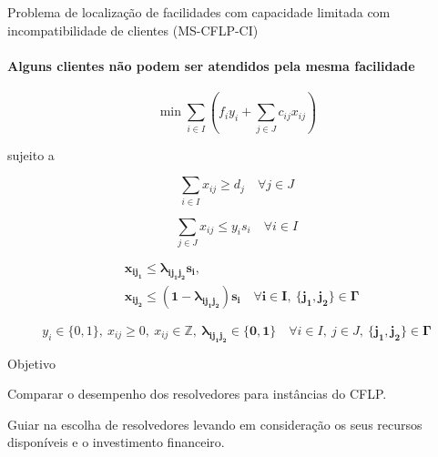 \documentclass[aspectratio=169]{beamer}
\begin{document}
	\begin{frame}{Problema de localização de facilidades com capacidade limitada com incompatibilidade de clientes (MS-CFLP-CI)}
		\framesubtitle{Alguns clientes não podem ser atendidos pela mesma facilidade}
		
		\begin{equation}
			\label{ci:obj}		
			\min \sum_{i \in I} 
			(
			f_i y_i + \sum_{j \in J} c_{ij} x_{ij}
			)
		\end{equation}
		
		sujeito a 				
		
		\begin{equation}
			\label{ci:const:demand}		
			\sum_{i \in I} x_{ij} \ge d_j 
			\quad
			\forall j \in J
		\end{equation}
	
		\begin{equation}
			\label{ci:const:capacity}		
			\sum_{j \in J} x_{ij} \le y_i s_i 
			\quad
			\forall i \in I
		\end{equation}

		\begin{equation}
			\begin{aligned}
				\label{ci:const:incomp}		
				& \boldsymbol{x_{ij_1} \le \lambda_{ij_1j_2} s_i}, 
				\\ & \boldsymbol{x_{ij_2} \le (1 - \lambda_{ij_1j_2}) s_i} 
				\quad
				\boldsymbol{\forall i \in I}, 
				\ \boldsymbol{\{ j_1, j_2 \} \in \Gamma}  
			\end{aligned}
		\end{equation}
	
		

		\begin{equation}
			\label{ci:dom:var}		
			y_i \in \{0, 1\}, 
			\ x_{ij} \ge 0, 
			\ x_{ij} \in \mathbb{Z},				
			\ \boldsymbol{\lambda_{ij_1j_2} \in \{ 0, 1 \}}	
			\quad
			\forall i \in I, \ j \in J,			
			\ \boldsymbol{\{ j_1, j_2 \} \in \Gamma}	
		\end{equation}
		
		
		
		  
		
		
		
		
		
	\end{frame}

	\begin{frame}{Objetivo}

		\begin{block}{}
			Comparar o desempenho dos resolvedores para instâncias do CFLP.	  
		\end{block}
		
		Guiar na escolha de resolvedores levando em consideração os seus recursos disponíveis e o investimento financeiro.
		

		
		
	\end{frame}
\end{document}
